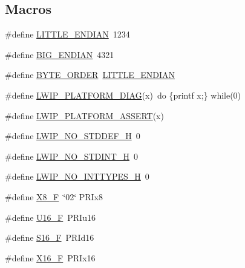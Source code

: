\subsection*{Macros}
\begin{DoxyCompactItemize}
\item 
\#define \hyperlink{openmote-cc2538_2lwip_2src_2include_2lwip_2arch_8h_a8782a401fbf55261460863fc2f8df1ce}{L\+I\+T\+T\+L\+E\+\_\+\+E\+N\+D\+I\+AN}~1234
\item 
\#define \hyperlink{openmote-cc2538_2lwip_2src_2include_2lwip_2arch_8h_a23eb5e058a210efdde3d64e69679fafa}{B\+I\+G\+\_\+\+E\+N\+D\+I\+AN}~4321
\item 
\#define \hyperlink{group__compiler__abstraction_ga1771b7fb65ee640524d0052f229768c3}{B\+Y\+T\+E\+\_\+\+O\+R\+D\+ER}~\hyperlink{openmote-cc2538_2lwip_2src_2include_2lwip_2arch_8h_a8782a401fbf55261460863fc2f8df1ce}{L\+I\+T\+T\+L\+E\+\_\+\+E\+N\+D\+I\+AN}
\item 
\#define \hyperlink{group__compiler__abstraction_gaccef167be13a500ce30036030a9b142b}{L\+W\+I\+P\+\_\+\+P\+L\+A\+T\+F\+O\+R\+M\+\_\+\+D\+I\+AG}(x)~do \{printf x;\} while(0)
\item 
\#define \hyperlink{group__compiler__abstraction_ga7e8bcd0282525704d6dd596bdd1b47d0}{L\+W\+I\+P\+\_\+\+P\+L\+A\+T\+F\+O\+R\+M\+\_\+\+A\+S\+S\+E\+RT}(x)
\item 
\#define \hyperlink{group__compiler__abstraction_ga53954d507c09e521ec0d44a2450bb89d}{L\+W\+I\+P\+\_\+\+N\+O\+\_\+\+S\+T\+D\+D\+E\+F\+\_\+H}~0
\item 
\#define \hyperlink{group__compiler__abstraction_ga122c754db96ecad23bc6f4541d6360c1}{L\+W\+I\+P\+\_\+\+N\+O\+\_\+\+S\+T\+D\+I\+N\+T\+\_\+H}~0
\item 
\#define \hyperlink{group__compiler__abstraction_ga5bf52d6f2729d0c8afd365f69d7d4373}{L\+W\+I\+P\+\_\+\+N\+O\+\_\+\+I\+N\+T\+T\+Y\+P\+E\+S\+\_\+H}~0
\item 
\#define \hyperlink{group__compiler__abstraction_ga90c130a97711a9d7e5015c610f2dfe8f}{X8\+\_\+F}~\char`\"{}02\char`\"{} P\+R\+Ix8
\item 
\#define \hyperlink{group__compiler__abstraction_gaa9d7f6eb2ee9fcc5eda3545dbb1886e0}{U16\+\_\+F}~P\+R\+Iu16
\item 
\#define \hyperlink{group__compiler__abstraction_gac05a82d37afb251470f5e17ca15ab6e9}{S16\+\_\+F}~P\+R\+Id16
\item 
\#define \hyperlink{group__compiler__abstraction_ga1418f92673e54a36b6e376109e526382}{X16\+\_\+F}~P\+R\+Ix16
\item 

\end{DoxyCompactItemize}
